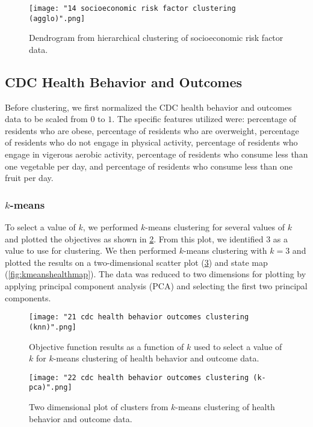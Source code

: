 \documentclass{article}
\begin{document}
\begin{figure}[h]
\centering
\caption{Dendrogram from hierarchical clustering of socioeconomic risk factor data.}
\texttt{[image: "14 socioeconomic risk factor clustering (agglo)".png]}
\label{fig:dbsociodg}
\end{figure}

\subsection{CDC Health Behavior and Outcomes}
Before clustering, we first normalized the CDC health behavior and outcomes data to be scaled from $0$ to $1$. The specific features utilized were: percentage of residents who are obese, percentage of residents who are overweight, percentage of residents who do not engage in physical activity, percentage of residents who engage in vigerous aerobic activity, percentage of residents who consume less than one vegetable per day, and percentage of residents who consume less than one fruit per day.

\subsubsection{$k$-means}
To select a value of $k$, we performed $k$-means clustering for several values of $k$ and plotted the objectives as shown in \cref{fig:kmeanshealthselect}. From this plot, we identified $3$ as a value to use for clustering. We then performed $k$-means clustering with $k=3$ and plotted the results on a two-dimensional scatter plot (\ref{fig:kmeanshealthscat}) and state map (\ref{fig:kmeanshealthmap}). The data was reduced to two dimensions for plotting by applying principal component analysis (PCA) and selecting the first two principal components.

\begin{figure}[h]
\centering
\caption{Objective function results as a function of $k$ used to select a value of $k$ for $k$-means clustering of health behavior and outcome data.}
\texttt{[image: "21 cdc health behavior outcomes clustering (knn)".png]}
\label{fig:kmeanshealthselect}
\end{figure}

\begin{figure}[h]
\centering
\caption{Two dimensional plot of clusters from $k$-means clustering of health behavior and outcome data.}
\texttt{[image: "22 cdc health behavior outcomes clustering (k-pca)".png]}
\label{fig:kmeanshealthscat}
\end{figure}
\end{document}
